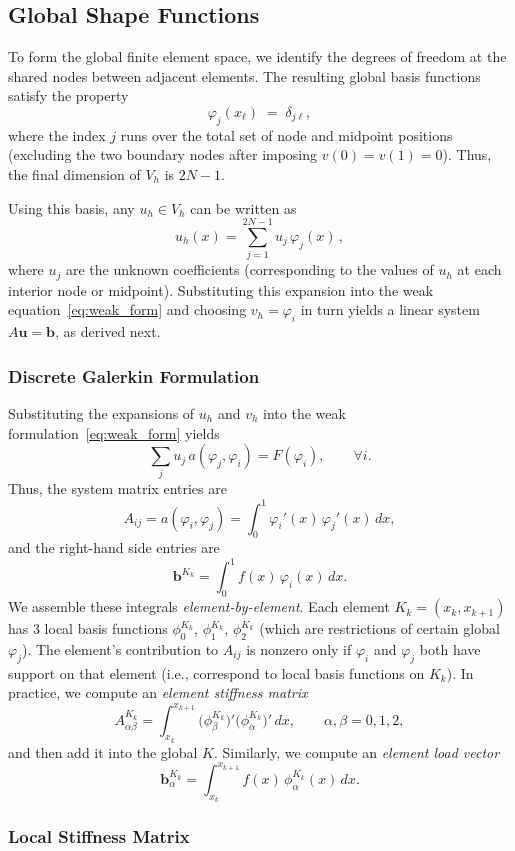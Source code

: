 \documentclass[a4paper,10pt]{article}
\begin{document}
\subsection{Global Shape Functions}
To form the global finite element space, we identify the degrees of freedom at the shared nodes between adjacent elements.
The resulting global basis functions satisfy the property
\[
	\varphi_j(x_\ell) \;=\; \delta_{j\ell},
\]
where the index $j$ runs over the total set of node and midpoint positions (excluding the two boundary nodes after imposing $v(0)=v(1)=0$). Thus, the final dimension of $V_h$ is $2N-1$.

Using this basis, any \(u_h \in V_h\) can be written as
\[
	u_h(x) = \sum_{j=1}^{2N-1} u_j\,\varphi_j(x)\,,
\]
where \(u_j\) are the unknown coefficients (corresponding to the values of \(u_h\) at each interior node or midpoint).
Substituting this expansion into the weak equation~\eqref{eq:weak_form} and choosing \(v_h=\varphi_i\) in turn yields a linear system \(A \mathbf{u} = \mathbf{b}\), as derived next.

\subsubsection{Discrete Galerkin Formulation}

Substituting the expansions of \(u_h\) and \(v_h\) into the weak formulation~\eqref{eq:weak_form} yields
\[
	\sum_{j} u_j\,a(\varphi_j,\varphi_i) = F(\varphi_i), \qquad \forall i.
\]
Thus, the system matrix entries are
\[
	A_{ij} = a(\varphi_i,\varphi_j) = \int_{0}^{1} \varphi_i'(x)\,\varphi_j'(x)\,dx,
\]
and the right-hand side entries are
\[
	\symbf{b}^{K_k} = \int_{0}^{1} f(x)\,\varphi_i(x)\,dx.
\]
We assemble these integrals \emph{element-by-element}. 
Each element \(K_k=(x_k,x_{k+1})\) has 3 local basis functions \(\phi_0^{K_k},\,\phi_1^{K_k},\,\phi_2^{K_k}\) (which are restrictions of certain global \(\varphi_j\)). The element’s contribution to \(A_{ij}\) is nonzero only if \(\varphi_i\) and \(\varphi_j\) both have support on that element (i.e., correspond to local basis functions on \(K_k\)). In practice, we compute an \emph{element stiffness matrix}
\[
	A^{K_k}_{\alpha\beta}= \int_{x_k}^{x_{k+1}} \bigl(\phi_{\beta}^{K_k}\bigr)' \bigl(\phi_{\alpha}^{K_k}\bigr)'\,dx,\qquad \alpha,\beta=0,1,2,
\]
and then add it into the global \(K\). Similarly, we compute an \emph{element load vector}
\[
	\symbf{b}^{K_k}_\alpha = \int_{x_k}^{x_{k+1}} f(x)\,\phi_{\alpha}^{K_k}(x)\,dx.
\]

\subsubsection{Local Stiffness Matrix}
\end{document}
